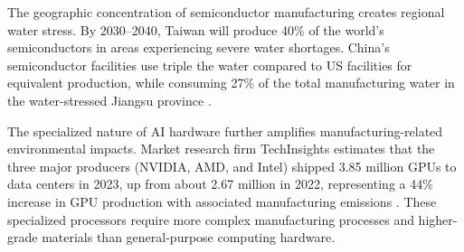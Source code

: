 \documentclass[twoside]{ai_ethics_class}
\begin{document}
The geographic concentration of semiconductor manufacturing creates regional water stress.
By 2030–2040, Taiwan will produce 40\% of the world’s semiconductors in areas experiencing severe water shortages.
China's semiconductor facilities use triple the water compared to US facilities for equivalent production, while consuming 27\% of the total manufacturing water in the water-stressed Jiangsu province \cite{frost2019quantifying}.

The specialized nature of AI hardware further amplifies manufacturing-related environmental impacts.
Market research firm TechInsights estimates that the three major producers (NVIDIA, AMD, and Intel) shipped 3.85 million GPUs to data centers in 2023, up from about 2.67 million in 2022, representing a 44\% increase in GPU production with associated manufacturing emissions \cite{techinsights2024gpu}.
These specialized processors require more complex manufacturing processes and higher-grade materials than general-purpose computing hardware.




\end{document}
